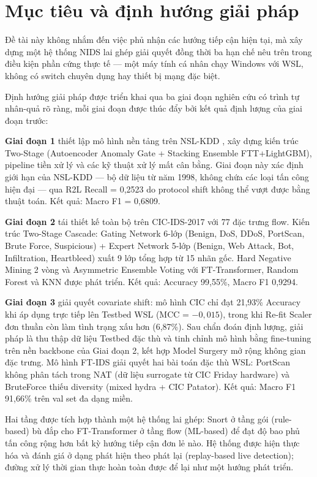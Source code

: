 \documentclass[../DoAn.tex]{subfiles}
\begin{document}
\section{Mục tiêu và định hướng giải pháp}
\label{sec:mt}

Đề tài này không nhắm đến việc phủ nhận các hướng tiếp cận hiện tại, mà xây dựng một hệ thống NIDS lai ghép giải quyết đồng thời ba hạn chế nêu trên trong điều kiện phần cứng thực tế --- một máy tính cá nhân chạy Windows với WSL, không có switch chuyên dụng hay thiết bị mạng đặc biệt.

Định hướng giải pháp được triển khai qua ba giai đoạn nghiên cứu có trình tự nhân-quả rõ ràng, mỗi giai đoạn được thúc đẩy bởi kết quả định lượng của giai đoạn trước:

\textbf{Giai đoạn 1} thiết lập mô hình nền tảng trên NSL-KDD \cite{tavallaee2009}, xây dựng kiến trúc Two-Stage (Autoencoder Anomaly Gate + Stacking Ensemble FTT+LightGBM), pipeline tiền xử lý và các kỹ thuật xử lý mất cân bằng. Giai đoạn này xác định giới hạn của NSL-KDD --- bộ dữ liệu từ năm 1998, không chứa các loại tấn công hiện đại --- qua R2L Recall = 0,2523 do protocol shift không thể vượt được bằng thuật toán. Kết quả: Macro F1 = 0,6809.

\textbf{Giai đoạn 2} tái thiết kế toàn bộ trên CIC-IDS-2017 \cite{sharafaldin2018} với 77 đặc trưng flow. Kiến trúc Two-Stage Cascade: Gating Network 6-lớp (Benign, DoS, DDoS, PortScan, Brute Force, Suspicious) + Expert Network 5-lớp (Benign, Web Attack, Bot, Infiltration, Heartbleed) xuất 9 lớp tổng hợp từ 15 nhãn gốc. Hard Negative Mining 2 vòng và Asymmetric Ensemble Voting với FT-Transformer, Random Forest và KNN được phát triển. Kết quả: Accuracy 99,55\%, Macro F1 0,9294.

\textbf{Giai đoạn 3} giải quyết covariate shift: mô hình CIC chỉ đạt 21,93\% Accuracy khi áp dụng trực tiếp lên Testbed WSL (MCC = $-0{,}015$), trong khi Re-fit Scaler đơn thuần còn làm tình trạng xấu hơn (6,87\%). Sau chẩn đoán định lượng, giải pháp là thu thập dữ liệu Testbed đặc thù và tinh chỉnh mô hình bằng fine-tuning trên nền backbone của Giai đoạn 2, kết hợp Model Surgery mở rộng không gian đặc trưng. Mô hình FT-IDS giải quyết hai bài toán đặc thù WSL: PortScan không phân tách trong NAT (dữ liệu surrogate từ CIC Friday hardware) và BruteForce thiếu diversity (mixed hydra + CIC Patator). Kết quả: Macro F1 91,66\% trên val set đa dạng miền.

Hai tầng được tích hợp thành một hệ thống lai ghép: Snort ở tầng gói (rule-based) bù đắp cho FT-Transformer ở tầng flow (ML-based) để đạt độ bao phủ tấn công rộng hơn bất kỳ hướng tiếp cận đơn lẻ nào. Hệ thống được hiện thực hóa và đánh giá ở dạng phát hiện theo phát lại (replay-based live detection); đường xử lý thời gian thực hoàn toàn được để lại như một hướng phát triển.
\end{document}
